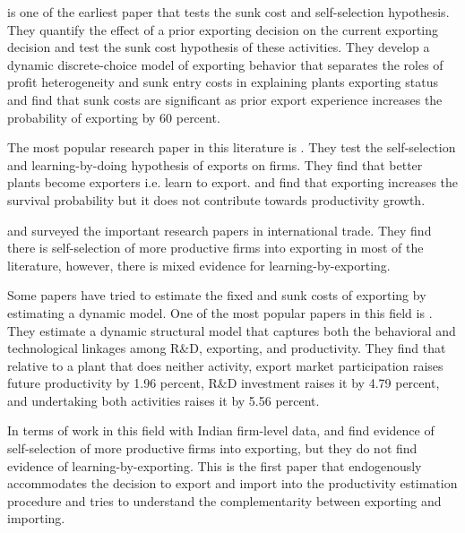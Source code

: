 \documentclass[12pt]{article}
\begin{document}
\textcite{roberts1997decision} is one of the earliest paper that
tests the sunk cost and self-selection hypothesis. They quantify the effect of a prior exporting
decision on the current exporting decision and test the sunk cost
hypothesis of these activities.  They  develop a dynamic
discrete-choice 
model of exporting behavior that separates the roles of profit heterogeneity
 and sunk entry costs in explaining plants exporting status and find
 that sunk costs are significant as prior export experience increases
 the probability of exporting by 60 percent.  

The most popular research paper in this literature is
\textcite{bernard1999exceptional}. They test the self-selection and
 learning-by-doing hypothesis of exports on firms. They find that better
 plants become exporters i.e. learn to export. and find that exporting
 increases the survival probability but it does not contribute towards
 productivity growth.  

\textcite{wagner2007exports} and \textcite{wagner2012international}
surveyed the important research papers in international
trade. They find  there is self-selection of more productive
firms into exporting in most of the literature, however, there is mixed evidence for
learning-by-exporting.  


Some papers have tried to estimate the fixed and sunk costs of
exporting by estimating a dynamic model. One of the most popular papers
in this field is \textcite{aw2011}. They estimate a dynamic structural model that captures both the behavioral
and technological linkages among R\&D, exporting, and
productivity. They find that relative to a
plant that does neither activity, export market participation raises future productivity
by 1.96 percent, R\&D investment raises it by 4.79 percent, and undertaking both
activities raises it by 5.56 percent. 

In terms of work in this field with Indian firm-level data,
\textcite{haidar2012trade} and \textcite{gupta2018exporting} find evidence of
self-selection of more productive firms into exporting, but they do
not find evidence of learning-by-exporting. This is the first
paper that endogenously accommodates the decision to export and import
into the productivity estimation procedure and tries to understand the
complementarity between exporting and importing. 

\end{document}
